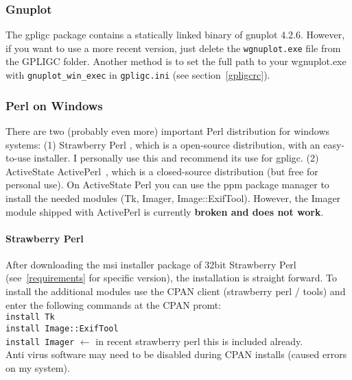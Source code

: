 \subsubsection{Gnuplot}
The gpligc package contains a statically linked binary of gnuplot 4.2.6. 
However, if you want to use a more recent version, just delete the \texttt{wgnuplot.exe} file from the GPLIGC folder.
Another method is to set the full path to your wgnuplot.exe with \texttt{gnuplot\_win\_exec} in \texttt{gpligc.ini} (see section~\ref{gpligcrc}).

\subsubsection{Perl on Windows}
\label{perl}
There are two (probably even more) important Perl distribution for windows systems:
(1) Strawberry Perl \cite{strawberryperl}, which is a open-source distribution, with an easy-to-use installer.
I personally use this and recommend its use for gpligc.
(2) ActiveState ActivePerl~\cite{activeperl}, which is a closed-source distribution (but free for personal use).
On ActiveState Perl you can use the ppm package manager to install the needed modules (Tk, Imager, Image::ExifTool).
However, the Imager module shipped with ActivePerl is currently \textbf{broken and does not work}.


\paragraph{Strawberry Perl}
After downloading the msi installer package of 32bit Strawberry Perl (see~\ref{requirements} for specific version),
the installation is straight forward.
To install the additional modules use the CPAN client (strawberry perl / tools) and enter the following commands
at the CPAN promt:\\
\texttt{install Tk}\\
\texttt{install Image::ExifTool}\\
\texttt{install Imager}  $\leftarrow$ in recent strawberry perl this is included already.\\
Anti virus software may need to be disabled during CPAN installs (caused errors on my system).

